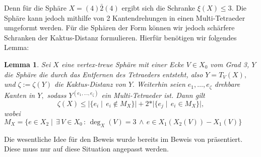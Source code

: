 \documentclass[12pt,titlepage,twoside,cleardoublepage]{article}
\theoremstyle{nummermitklammern}
\newtheorem{lemma}[temp]{Lemma}
\newtheorem{lemma}[zahl]{Lemma}
\numberwithin{equation}{section}
\begin{document}
Denn für die Sphäre $X=(4)\bar{2}(4)$ ergibt sich die Schranke $\xi(X)\leq 3.$ Die Sphäre kann jedoch mithilfe von 2 Kantendrehungen in einen Multi-Tetraeder umgeformt werden. Für die Sphären der Form können wir jedoch schärfere Schranken der Kaktus-Distanz formulieren. Hierfür benötigen wir folgendes Lemma:
\begin{lemma}
Sei $X$ eine vertex-treue Sphäre mit einer Ecke $V\in X_0$ vom Grad 3,  $Y$ die Sphäre die durch das Entfernen des Tetraeders entsteht, also $Y=T_V(X),$ und $\zeta:=\zeta(Y)$ die Kaktus-Distanz von $Y.$ Weiterhin seien $e_1,\ldots,e_{\zeta}$ drehbare Kanten in $Y,$ sodass $Y^{(e_1,\ldots,e_{\zeta})}$ ein Multi-Tetraeder ist. Dann gilt
\[
\zeta(X)\leq \vert\{e_i\mid \, e_i \notin M_X\}\vert+2*\vert \{e_j\mid \, e_i \in M_X\}\vert,
\]
wobei $M_X=\{e\in X_2\mid \,\exists\,V\in X_0\, :\, \deg_X(V)=3 \, \wedge \, e \in X_1(X_2(V))-X_1(V) \}$
\end{lemma}
Die wesentliche Idee für den Beweis wurde bereits im Beweis von  präsentiert. Diese muss nur auf diese Situation angepasst werden.
\end{document}
